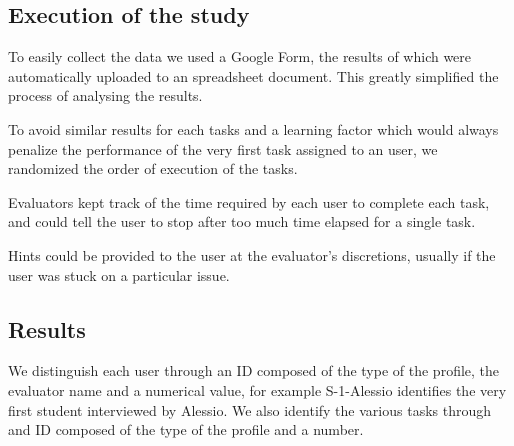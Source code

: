 \subsection{Execution of the study}

    To easily collect the data we used a Google Form, the results of which were automatically uploaded to an spreadsheet document. This greatly simplified the process of analysing the results.

    To avoid similar results for each tasks and a learning factor which would always penalize the performance of the very first task assigned to an user, we randomized the order of execution of the tasks.

    Evaluators kept track of the time required by each user to complete each task, and could tell the user to stop after too much time elapsed for a single task.

    Hints could be provided to the user at the evaluator's discretions, usually if the user was stuck on a particular issue.

\subsection{Results}

    We distinguish each user through an ID composed of the type of the profile, the evaluator name and a numerical value, for example S-1-Alessio identifies the very first student interviewed by Alessio. We also identify the various tasks through and ID composed of the type of the profile and a number.
